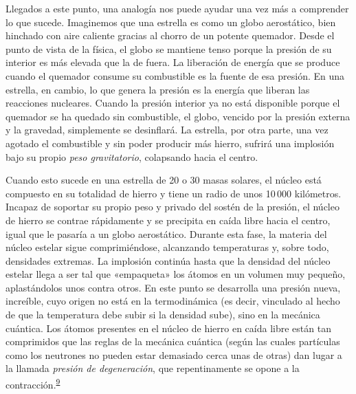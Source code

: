 Llegados a este punto, una analogía nos puede ayudar una vez más a comprender lo que sucede. Imaginemos que una estrella es como un globo aerostático, bien hinchado con aire caliente gracias al chorro de un potente quemador. Desde el punto de vista de la física, el globo se mantiene tenso porque la presión de su interior es más elevada que la de fuera. La liberación de energía que se produce cuando el quemador consume su combustible es la fuente de esa presión. En una estrella, en cambio, lo que genera la presión es la energía que liberan las reacciones nucleares. Cuando la presión interior ya no está disponible porque el quemador se ha quedado sin combustible, el globo, vencido por la presión externa y la gravedad, simplemente se desinflará. La estrella, por otra parte, una vez agotado el combustible y sin poder producir más hierro, sufrirá una implosión bajo su propio \emph{peso gravitatorio}, colapsando hacia el centro.

Cuando esto sucede en una estrella de 20 o 30 masas solares, el núcleo está compuesto en su totalidad de hierro y tiene un radio de unos 10\,000 kilómetros. Incapaz de soportar su propio peso y privado del sostén de la presión, el núcleo de hierro se contrae rápidamente y se precipita en caída libre hacia el centro, igual que le pasaría a un globo aerostático. Durante esta fase, la materia del núcleo estelar sigue comprimiéndose, alcanzando temperaturas y, sobre todo, densidades extremas. La implosión continúa hasta que la densidad del núcleo estelar llega a ser tal que «empaqueta» los átomos en un volumen muy pequeño, aplastándolos unos contra otros. En este punto se desarrolla una presión nueva, increíble, cuyo origen no está en la termodinámica (es decir, vinculado al hecho de que la temperatura debe subir si la densidad sube), sino en la mecánica cuántica. Los átomos presentes en el núcleo de hierro en caída libre están tan comprimidos que las reglas de la mecánica cuántica (según las cuales partículas como los neutrones no pueden estar demasiado cerca unas de otras) dan lugar a la llamada \emph{presión de degeneración}, que repentinamente se opone a la contracción.\textsuperscript{\hyperlink{note:05-09}{9}}

